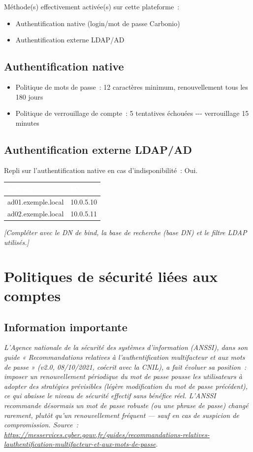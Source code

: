 \documentclass[11pt,a4paper]{report}
\newcommand{\placeholder}[1]{\textit{\textcolor{placeholdercol}{[#1]}}\par\vspace{4pt}}
\newcommand{\tblhead}[1]{\textcolor{white}{\textbf{#1}}}
\begin{document}
Méthode(s) effectivement activée(s) sur cette plateforme~:
\begin{itemize}[nosep]
  \item Authentification native (login/mot de passe Carbonio)
  \item Authentification externe LDAP/AD
\end{itemize}

\subsection{Authentification native}
\begin{itemize}[nosep]
  \item Politique de mots de passe~: 12 caractères minimum, renouvellement tous les 180 jours
  \item Politique de verrouillage de compte~: 5 tentatives échouées -\allowbreak{}-\allowbreak{}-\allowbreak{} verrouillage 15 minutes
\end{itemize}

\subsection{Authentification externe LDAP/AD}
Repli sur l'authentification native en cas d'indisponibilité~: Oui.

\begin{longtable}{|p{5.5cm}|p{5.5cm}|}
\hline
\rowcolor{primary}\tblhead{Serveur} & \tblhead{IP} \\
\hline
\endhead
ad01.\allowbreak{}exemple.\allowbreak{}local & 10.\allowbreak{}0.\allowbreak{}5.\allowbreak{}10 \\
\hline
ad02.\allowbreak{}exemple.\allowbreak{}local & 10.\allowbreak{}0.\allowbreak{}5.\allowbreak{}11 \\
\hline
\end{longtable}
\placeholder{Compléter avec le DN de bind, la base de recherche (base DN) et le filtre LDAP utilisés.}



\section{Politiques de sécurité liées aux comptes}

\subsection{Information importante}
\textit{L'Agence nationale de la sécurité des systèmes d'information (ANSSI), dans son guide « Recommandations relatives à l'authentification multifacteur et aux mots de passe » (v2.0, 08/10/2021, coécrit avec la CNIL), a fait évoluer sa position~: imposer un renouvellement périodique du mot de passe pousse les utilisateurs à adopter des stratégies prévisibles (légère modification du mot de passe précédent), ce qui abaisse le niveau de sécurité effectif sans bénéfice réel. L'ANSSI recommande désormais un mot de passe robuste (ou une phrase de passe) changé rarement, plutôt qu'un renouvellement fréquent --- sauf en cas de suspicion de compromission. Source~: \url{https://messervices.cyber.gouv.fr/guides/recommandations-relatives-lauthentification-multifacteur-et-aux-mots-de-passe}.}
\end{document}

